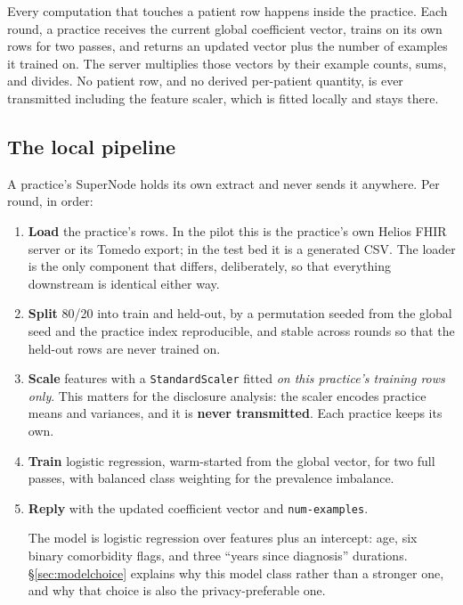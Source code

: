 \label{sec:method}
\statusMethod

\begin{shortanswer}
Every computation that touches a patient row happens inside the practice. Each round, a practice
receives the current global coefficient vector, trains on its own rows for two passes, and returns
an updated vector plus the number of examples it trained on. The server multiplies those vectors by
their example counts, sums, and divides. No patient row, and no derived per-patient quantity, is
ever transmitted including the feature scaler, which is fitted locally and stays there.
\end{shortanswer}

\subsection{The local pipeline}

A practice's SuperNode holds its own extract and never sends it anywhere. Per round, in order:

\begin{enumerate}
  \item \textbf{Load} the practice's rows. In the pilot this is the practice's own Helios FHIR server or
        its Tomedo export; in the test bed it is a generated CSV. The loader is the only component
        that differs, deliberately, so that everything downstream is identical either way.
  \item \textbf{Split} 80/20 into train and held-out, by a permutation seeded from the global seed
        and the practice index reproducible, and stable across rounds so that the held-out rows
        are never trained on.
  \item \textbf{Scale} features with a \texttt{StandardScaler} fitted \emph{on this practice's
        training rows only}. This matters for the disclosure analysis: the scaler encodes practice
        means and variances, and it is \textbf{never transmitted}. Each practice keeps its own.
  \item \textbf{Train} logistic regression, warm-started from the global vector, for two full
        passes, with balanced class weighting for the prevalence imbalance.
  \item \textbf{Reply} with the updated coefficient vector and \texttt{num-examples}.

        The model is logistic regression over \NumFeatures{} features plus an intercept: age, six
        binary comorbidity flags, and three ``years since diagnosis'' durations.
        \S\ref{sec:modelchoice} explains why this model class rather than a stronger one, and why
        that choice is also the privacy-preferable one.
\end{enumerate}

